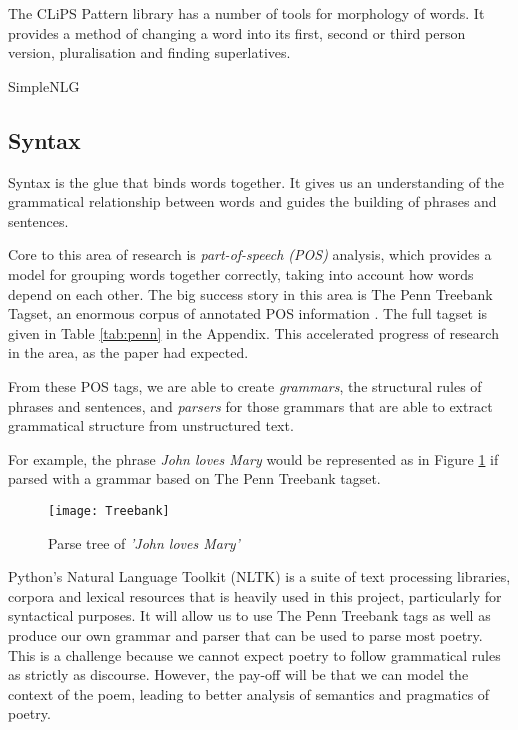 The CLiPS Pattern library has a number of tools for morphology of words. It provides a method of changing a word into its first, second or third person version, pluralisation and finding superlatives.\cite{de2012pattern}

SimpleNLG


\subsection{Syntax}
\label{sec:syntax}
Syntax is the glue that binds words together. It gives us an understanding of the grammatical relationship between words and guides the building of phrases and sentences.

Core to this area of research is \textit{part-of-speech (POS)} analysis, which provides a model for grouping words together correctly, taking into account how words depend on each other. The big success story in this area is The Penn Treebank Tagset, an enormous corpus of annotated POS information \cite{marcus1993building}. The full tagset is given in Table \ref{tab:penn} in the Appendix. This accelerated progress of research in the area, as the paper had expected. 

From these POS tags, we are able to create \textit{grammars}, the structural rules of phrases and sentences, and \textit{parsers} for those grammars that are able to extract grammatical structure from unstructured text.

For example, the phrase \textit{John loves Mary} would be represented as in Figure \ref{fig:parse} if parsed with a grammar based on The Penn Treebank tagset.

\begin{figure}[h!]
\centering
\texttt{[image: Treebank]}
\caption{Parse tree of \textit{'John loves Mary'}}
\label{fig:parse}
\end{figure}

Python's Natural Language Toolkit (NLTK)\cite{bird2009natural} is a suite of text processing libraries, corpora and lexical resources that is heavily used in this project, particularly for syntactical purposes. It will allow us to use The Penn Treebank tags as well as produce our own grammar and parser that can be used to parse most poetry. This is a challenge because we cannot expect poetry to follow grammatical rules as strictly as discourse. However, the pay-off will be that we can model the context of the poem, leading to better analysis of semantics and pragmatics of poetry.

